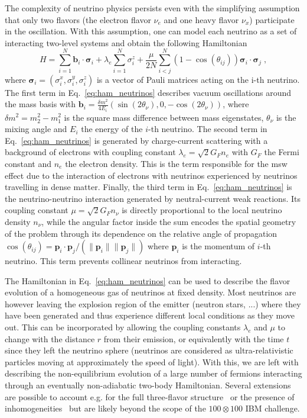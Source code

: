 The complexity of neutrino physics 
persists even with the simplifying assumption that only two flavors (the electron flavor $\nu_e$ and one heavy flavor $\nu_x$) participate in the oscillation. With this assumption, one can model each neutrino as a set of interacting two-level systems and obtain the following Hamiltonian~\cite{Pehlivan2011}
\begin{equation}
\label{eq:ham_neutrinos}
H=\sum_{i=1}^N \boldsymbol{b}_i \cdot \boldsymbol{\sigma}_i + \lambda_e \sum_{i=1}^N \sigma^z_i + \frac{\mu}{2N}\sum_{i<j}^N \left(1-\cos(\theta_{ij})\right) \boldsymbol{\sigma}_i \cdot \boldsymbol{\sigma}_j\;, 
\end{equation}
where $\boldsymbol{\sigma}_i=(\sigma_i^x,\sigma_i^y,\sigma_i^z)$ is a vector of Pauli matrices acting on the i-th neutrino.
The first term in Eq.~\eqref{eq:ham_neutrinos} describes vacuum oscillations around the mass basis with $\boldsymbol{b}_i = \frac{\delta m^2}{4 E_i}( \sin(2 \theta_{\nu}), 0, - \cos(2\theta_{\nu}))$,
where $\delta m^2 = m_2^2 - m_1^2 $ is the square mass difference between mass eigenstates, $\theta_\nu$ is the mixing angle and $E_i$ the energy of the $i$-th neutrino. The second term in Eq.~\eqref{eq:ham_neutrinos} is generated by charge-current scattering with a background of electrons with coupling constant $\lambda_e=\sqrt{2}G_Fn_e$ with $G_F$ the Fermi constant and $n_e$ the electron density. This is the term responsible for the \gls{msw} effect due to the interaction of electrons with neutrinos experienced by neutrinos travelling in dense matter. Finally, the third term in Eq.~\eqref{eq:ham_neutrinos} is the neutrino-neutrino interaction generated by neutral-current weak reactions. Its coupling constant $\mu=\sqrt{2}G_Fn_\nu$ is directly proportional to the local neutrino density $n_\nu$, while the angular factor inside the sum encodes the spatial geometry of the problem through its dependence on the relative angle of propagation $\cos(\theta_{ij})=\boldsymbol{p}_i\cdot\boldsymbol{p}_j/(\|\boldsymbol{p}_i\|\|\boldsymbol{p}_j\|)$ 
where $\boldsymbol{p}_i$ is the momentum of $i$-th neutrino. This term prevents collinear neutrinos from interacting.

The Hamiltonian in Eq.~\eqref{eq:ham_neutrinos} can be used to describe the flavor evolution of a homogeneous gas of neutrinos at fixed density. Most neutrinos are however leaving the explosion region of the emitter (neutron stars, ...) where they have been generated and thus experience different local conditions as they move out. This can be incorporated by allowing the coupling constants $\lambda_e$ and $\mu$ to change with the distance $r$ from their emission, or equivalently with the time $t$ since they left the neutrino sphere (neutrinos are considered as ultra-relativistic particles moving at approximately the speed of light). With this, we are left with describing the non-equilibrium evolution of a large number of fermions interacting through an eventually non-adiabatic two-body Hamiltonian. Several extensions are possible to account e.g. for the full three-flavor structure~\cite{Siwach2022} or the presence of inhomogeneities~\cite{Stirner_2018} but are likely beyond the scope of the $100 \otimes 100$ IBM challenge. 

